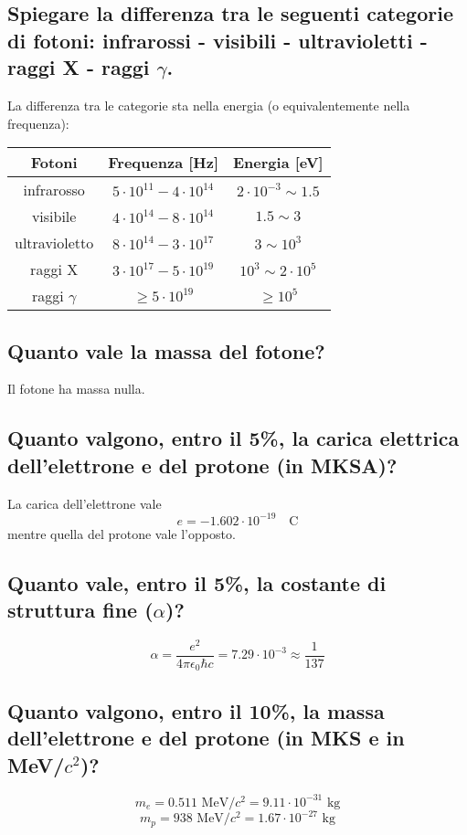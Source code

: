 \subsection[][Categorie di fotoni]{ Spiegare la differenza tra le seguenti categorie di fotoni: infrarossi - visibili - ultravioletti - raggi X - raggi $\gamma$. } 
La differenza tra le categorie sta nella energia (o equivalentemente nella frequenza):
\begin{table}[H]
	\centering
	\label{tab: fotoni}
	\begin{tabular}{ccc}
		Fotoni & Frequenza [Hz] & Energia [eV] \\
		\hline
		infrarosso & $5 \cdot 10^{11} - 4 \cdot 10^{14}$ & $2 \cdot 10^{-3} \sim 1.5$  \\
		visibile & $4 \cdot 10^{14} - 8 \cdot 10^{14}$ & $1.5 \sim  3$ \\
		ultravioletto & $8 \cdot 10^{14} - 3 \cdot 10^{17}$ & $3 \sim 10^3$ \\
		raggi X & $3 \cdot 10^{17} - 5 \cdot 10^{19}$ & $ 10^3 \sim 2 \cdot 10^{5} $ \\
		raggi $\gamma$ & $\ge 5 \cdot 10^{19}$ & $\ge 10^5$
	\end{tabular}
\end{table}

\subsection[]{ Quanto vale la massa del fotone?}
Il fotone ha massa nulla.
\subsection[]{ Quanto valgono, entro il 5\%, la carica elettrica dell’elettrone e del protone (in MKSA)?}
La carica dell'elettrone vale 
\[
	e = -1.602 \cdot 10^{-19} \quad \text{C}
\]
 mentre quella del protone vale l'opposto. 

\subsection[]{ Quanto vale, entro il 5\%, la costante di struttura fine ($\alpha$)?}
\[
	\alpha = \frac{e^{2}}{4\pi \epsilon_0 \hbar c} = 7.29 \cdot 10^{-3} \approx \frac{1}{137}
\] 	
\subsection[]{ Quanto valgono, entro il 10\%, la massa dell’elettrone e del protone (in MKS e in MeV/$c^2$)?}
\[
m_{e} = 0.511 \text{ MeV/$c^{2}$} = 9.11 \cdot 10^{-31} \text{ kg}
\] 
\[
m_{p} = 938 \text{ MeV/$c^{2}$} = 1.67 \cdot 10^{-27} \text{ kg}
\] 
